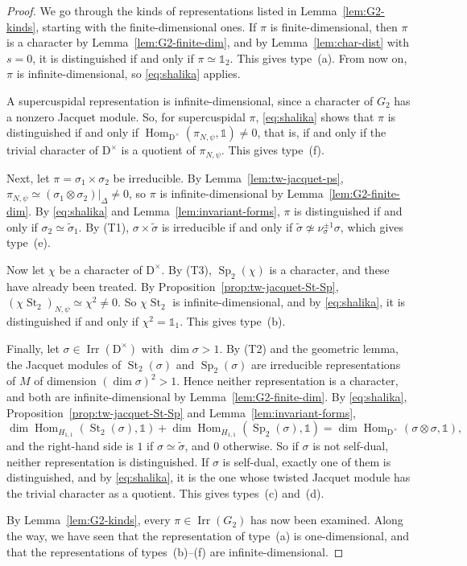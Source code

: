 \documentclass[11pt]{amsart}
\numberwithin{equation}{section}
\theoremstyle{plain}
\theoremstyle{definition}
\theoremstyle{remark}
\newcommand{\one}{\mathds{1}}
\DeclareMathOperator{\Hom}{Hom}
\DeclareMathOperator{\Irr}{Irr}
\DeclareMathOperator{\St}{St}
\DeclareMathOperator{\Sp}{Sp}
\begin{document}
\begin{proof}
	We go through the kinds of representations listed in Lemma~\ref{lem:G2-kinds}, starting with the finite-dimensional ones. If $\pi$ is finite-dimensional, then $\pi$ is a character by Lemma~\ref{lem:G2-finite-dim}, and by Lemma~\ref{lem:char-dist} with $s=0$, it is distinguished if and only if $\pi\simeq\one_2$. This gives type~(a). From now on, $\pi$ is infinite-dimensional, so \eqref{eq:shalika} applies.
	
	A supercuspidal representation is infinite-dimensional, since a character of $G_2$ has a nonzero Jacquet module. So, for supercuspidal $\pi$, \eqref{eq:shalika} shows that $\pi$ is distinguished if and only if $\Hom_{\mathrm{D}^\times}(\pi_{N,\psi},\one)\ne0$, that is, if and only if the trivial character of $\mathrm{D}^\times$ is a quotient of $\pi_{N,\psi}$. This gives type~(f).
	
	Next, let $\pi=\sigma_1\times\sigma_2$ be irreducible. By Lemma~\ref{lem:tw-jacquet-ps}, $\pi_{N,\psi}\simeq(\sigma_1\otimes\sigma_2)|_\Delta\ne0$, so $\pi$ is infinite-dimensional by Lemma~\ref{lem:G2-finite-dim}. By \eqref{eq:shalika} and Lemma~\ref{lem:invariant-forms}, $\pi$ is distinguished if and only if $\sigma_2\simeq\widetilde\sigma_1$. By (T1), $\sigma\times\widetilde\sigma$ is irreducible if and only if $\widetilde\sigma\not\simeq\nu_\sigma^{\pm1}\sigma$, which gives type~(e).
	
	Now let $\chi$ be a character of $\mathrm{D}^\times$. By (T3), $\Sp_2(\chi)$ is a character, and these have already been treated. By Proposition~\ref{prop:tw-jacquet-St-Sp}, $(\chi\St_2)_{N,\psi}\simeq\chi^2\ne0$. So $\chi\St_2$ is infinite-dimensional, and by \eqref{eq:shalika}, it is distinguished if and only if $\chi^2=\one_1$. This gives type~(b).
	
	Finally, let $\sigma\in\Irr(\mathrm{D}^\times)$ with $\dim\sigma>1$. By (T2) and the geometric lemma, the Jacquet modules of $\St_2(\sigma)$ and $\Sp_2(\sigma)$ are irreducible representations of $M$ of dimension $(\dim\sigma)^2>1$. Hence neither representation is a character, and both are infinite-dimensional by Lemma~\ref{lem:G2-finite-dim}. By \eqref{eq:shalika}, Proposition~\ref{prop:tw-jacquet-St-Sp} and Lemma~\ref{lem:invariant-forms},
	$$\dim\Hom_{H_{1,1}}(\St_2(\sigma),\one)+\dim\Hom_{H_{1,1}}(\Sp_2(\sigma),\one)=\dim\Hom_{\mathrm{D}^\times}(\sigma\otimes\sigma,\one),$$
	and the right-hand side is $1$ if $\sigma\simeq\widetilde\sigma$, and $0$ otherwise. So if $\sigma$ is not self-dual, neither representation is distinguished. If $\sigma$ is self-dual, exactly one of them is distinguished, and by \eqref{eq:shalika}, it is the one whose twisted Jacquet module has the trivial character as a quotient. This gives types~(c) and~(d).
	
	By Lemma~\ref{lem:G2-kinds}, every $\pi\in\Irr(G_2)$ has now been examined. Along the way, we have seen that the representation of type~(a) is one-dimensional, and that the representations of types~(b)--(f) are infinite-dimensional.
\end{proof}
\end{document}
